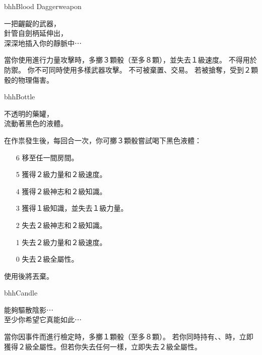 \linebreak[0]%
\begin{ItemCard}{bhh}{Blood Dagger}{weapon}
  \begin{CardStory}
    一把齷齪的武器，\\
    針管自劍柄延伸出，\\
    深深地插入你的靜脈中⋯
  \end{CardStory}
  當你使用\ThisName{}進行力量攻擊時，多擲３顆骰（至多８顆），並失去１級速度。\smallbreak
  \ThisName{}不得用於防禦。\smallbreak
  你不可同時使用多樣武器攻擊。\smallbreak
  \ThisName{}不可被棄置、交易。\smallbreak
  若\ThisName{}被搶奪，受到２顆骰的物理傷害。\smallbreak
\end{ItemCard}%
\linebreak[0]%
\begin{ItemCard}{bhh}{Bottle}{}
  \begin{CardStory}
    不透明的藥罐，\\
    流動著黑色的液體。
  \end{CardStory}
  在作祟發生後，每回合一次，你可擲３顆骰嘗試喝下黑色液體：
  \begin{itemize}
    \item[6] 移至任一間房間。
    \item[5] 獲得２級力量和２級速度。
    \item[4] 獲得２級神志和２級知識。
    \item[3] 獲得１級知識，並失去１級力量。
    \item[2] 失去２級神志和２級知識。
    \item[1] 失去２級力量和２級速度。
    \item[0] 失去２級全屬性。
  \end{itemize}
  使用後將\ThisName{}丟棄。\smallbreak
\end{ItemCard}%
\linebreak[0]%
\begin{ItemCard}{bhh}{Candle}{}
  \begin{CardStory}
    能夠驅散陰影⋯\\
    至少你希望它真能如此⋯
  \end{CardStory}
  當你因事件而進行檢定時，多擲１顆骰（至多８顆）。\smallbreak
  若你同時持有、、時，立即獲得２級全屬性。但若你失去任何一樣，立即失去２級全屬性。\smallbreak
\end{ItemCard}%
\linebreak[0]%
